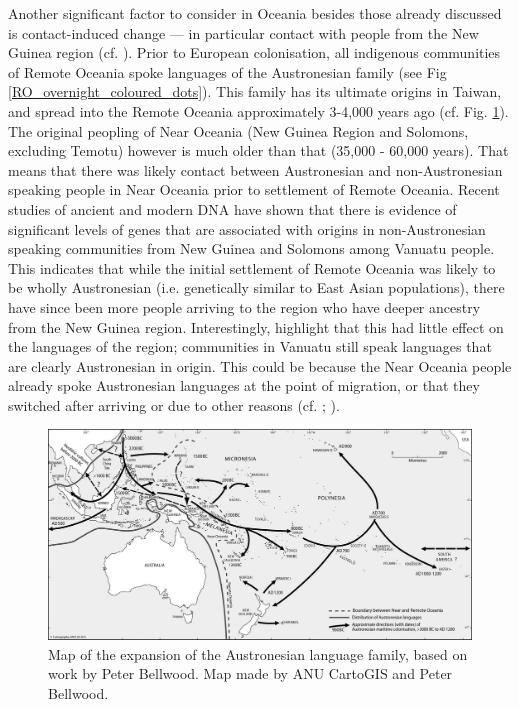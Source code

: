\documentclass[unnumsec,webpdf,modern,medium]{oup-authoring-template}
\begin{document}
Another significant factor to consider in Oceania besides those already discussed is contact-induced change --- in particular contact with people from the New Guinea region (cf. \citet{ross2017_new_guinea_region}). Prior to European colonisation, all indigenous communities of Remote Oceania spoke languages of the Austronesian family (see Fig \ref{RO_overnight_coloured_dots}). This family has its ultimate origins in Taiwan, and spread into the Remote Oceania approximately 3-4,000 years ago (cf. Fig. \ref{austro_expansion_bellwood}). The original peopling of Near Oceania (New Guinea Region and Solomons, excluding Temotu) however is much older than that (35,000 - 60,000 years). That means that there was likely contact between Austronesian and non-Austronesian speaking people in Near Oceania prior to settlement of Remote Oceania. Recent studies of ancient and modern DNA \citep{lipson_harvad_ancient_dna_vanuatu_2018, posth_jena_ancient_dna_vanuatu_2018} have shown that there is evidence of significant levels of genes that are associated with origins in non-Austronesian speaking communities from New Guinea and Solomons among Vanuatu people. This indicates that while the initial settlement of Remote Oceania was likely to be wholly Austronesian (i.e. genetically similar to East Asian populations), there have since been more people arriving to the region who have deeper ancestry from the New Guinea region. Interestingly, \citet{posth_jena_ancient_dna_vanuatu_2018} highlight that this had little effect on the languages of the region; communities in Vanuatu still speak languages that are clearly Austronesian in origin. This could be because the Near Oceania people already spoke Austronesian languages at the point of migration, or that they switched after arriving or due to other reasons (cf. \citet[288, 321]{barlow2023papuan}; \citet[209-210]{bedford2018ancient}).

\begin{figure}[ht]
\centering
\includegraphics[width=\textwidth]{ANU_cartography.jpg}
\caption{Map of the expansion of the Austronesian language family, based on work by Peter Bellwood. Map made by ANU CartoGIS and Peter Bellwood.}
\label{austro_expansion_bellwood}
\end{figure}
\end{document}
